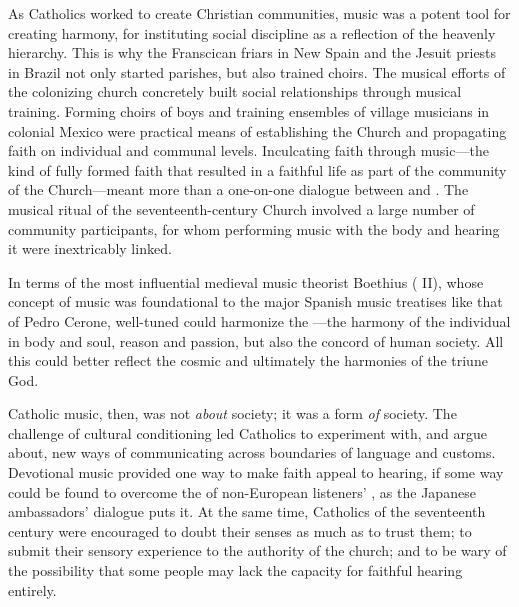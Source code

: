 As Catholics worked to create Christian communities, music was a potent tool 
for creating harmony, for instituting social discipline as a reflection of the 
heavenly hierarchy.%
    \Autocite{Baker:Harmony}
This is why the Franscican friars in New Spain and the Jesuit priests in Brazil 
not only started parishes, but also trained choirs.
The musical efforts of the colonizing church concretely built social 
relationships through musical training.
Forming choirs of boys and training ensembles of village musicians in colonial 
Mexico were practical means of establishing the Church and propagating faith on 
individual and communal levels.
Inculcating faith through music---the kind of fully formed faith that resulted 
in a faithful life as part of the community of the Church---meant more than a 
one-on-one dialogue between  and .
The musical ritual of the seventeenth-century Church involved a large number of 
community participants, for whom performing music with the body and hearing it 
were inextricably linked.

In terms of the most influential medieval music theorist Boethius 
( II), whose concept of music was foundational to the 
major Spanish music treatises like that of Pedro Cerone, well-tuned 
 could harmonize the 
---the harmony of the individual in body and soul, reason 
and passion, but also the concord of human society.%
    \Autocites
    [II: 187--189]{Boethius:Musica}
    [203--208]{Cerone:Melopeo}
    [22--31]{Baker:Harmony}
All this could better reflect the cosmic  and ultimately 
the harmonies of the triune God.

Catholic music, then, was not \emph{about} society; it was a form \emph{of} 
society.
The challenge of cultural conditioning led Catholics to experiment with, and 
argue about, new ways of communicating across boundaries of language and 
customs.
Devotional music provided one way to make faith appeal to hearing, if some way 
could be found to overcome the  of non-European listeners' 
, as the Japanese 
ambassadors' dialogue puts it.
At the same time, Catholics of the seventeenth century were encouraged to doubt 
their senses as much as to trust them; to submit their sensory experience to 
the authority of the church; and to be wary of the possibility that some people 
may lack the capacity for faithful hearing entirely.

